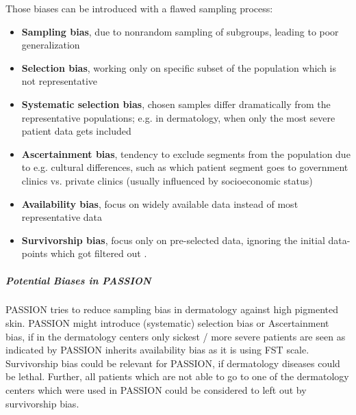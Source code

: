 \documentclass[12pt, a4paper, oneside]{book}   	%
\begin{document}
				Those biases can be introduced with a flawed sampling process:
				\begin{itemize}
					\item \textbf{Sampling bias}, due to nonrandom sampling of subgroups, leading to poor generalization \autocite{Mehrabi_2021}
					\item \textbf{Selection bias}, working only on specific subset of the population which is not representative \autocites{Mester_2022}{Chakraborty_2024}
					\item \textbf{Systematic selection bias}, chosen samples differ dramatically from the representative populations; e.g. in dermatology, when only the most severe patient data gets included \autocite{Chakraborty_2024, c5,c6,c33}
					\item \textbf{Ascertainment bias}, tendency to exclude segments from the population due to e.g. cultural differences, such as which patient segment goes to government clinics vs. private clinics (usually influenced by socioeconomic status) \autocite{Chakraborty_2024, c5}
					\item \textbf{Availability bias}, focus on widely available data instead of most representative data \autocites{Chakraborty_2024, c9, c10}{}
					\item \textbf{Survivorship bias}, focus only on pre-selected data, ignoring the initial data-points which got filtered out \autocite{Mester_2022}.
				\end{itemize}
				
				
				\subparagraph{Potential Biases in PASSION}
				PASSION tries to reduce sampling bias in dermatology against high pigmented skin.
				PASSION might introduce (systematic) selection bias or Ascertainment bias, if in the dermatology centers only sickest / more severe patients are seen as indicated by \cite{Chakraborty_2024}
				PASSION inherits availability bias as it is using \gls{FST} scale.
				Survivorship bias could be relevant for PASSION, if dermatology diseases could be lethal. Further, all patients which are not able to go to one of the dermatology centers which were used in PASSION could be considered to left out by survivorship bias.
				
\end{document}
